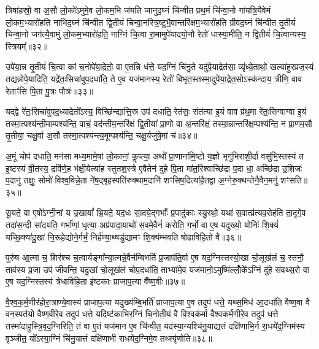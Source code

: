 त्रिषा॑हस्रो॒ वा अ॒सौ लो॒को॑\-ऽमुमे॒व लो॒कम॒भि ज॑यति जानुद॒घ्नं चि॑न्वीत प्रथ॒मं चि॑न्वा॒नो गा॑यत्रि॒यैवेमं लो॒कम॒भ्यारो॑हति नाभिद॒घ्नं चि॑न्वीत द्वि॒तीयं॑ चिन्वा॒नस्त्रि॒ष्टुभै॒वान्तरि॑क्षम॒भ्यारो॑हति ग्रीवद॒घ्नं चि॑न्वीत तृ॒तीयं॑ चिन्वा॒नो जग॑त्यै॒वामुं लो॒कम॒भ्यारो॑हति॒ नाग्निं चि॒त्वा रा॒मामुपे॑यादयो॒नौ रेतो॑ धास्या॒मीति॒ न द्वि॒तीयं॑ चि॒त्वान्यस्य॒ स्त्रियम्᳚॥३२॥

उपे॑या॒न्न तृ॒तीयं॑ चि॒त्वा कां च॒नोपे॑या॒द्रेतो॒ वा ए॒तन्नि ध॑त्ते॒ यद॒ग्निं चि॑नु॒ते यदु॑पे॒याद्रेत॑सा॒ व्यृ॑ध्ये॒ताथो॒ खल्वा॑हुरप्रज॒स्यं तद्यन्नोपे॒यादिति॒ यद्रे॑तः॒सिचा॑वुप॒दधा॑ति॒ ते ए॒व यज॑मानस्य॒ रेतो॑ बिभृत॒स्तस्मा॒दुपे॑या॒द्रेत॒सो\-ऽस्क॑न्दाय॒ त्रीणि॒ वाव रेताꣳ॑सि पि॒ता पु॒त्रः पौत्रः॑॥३३॥

यद्द्वे रे॑तः॒सिचा॑वुपद॒ध्याद्रेतो᳚\-ऽस्य॒ विच्छि॑न्द्यात्ति॒स्र उप॑ दधाति॒ रेत॑सः॒ संत॑त्या इ॒यं वाव प्र॑थ॒मा रे॑तः॒सिग्वाग्वा इ॒यं तस्मा॒त्पश्य॑न्ती॒माम्पश्य॑न्ति॒ वाचं॒ वद॑न्तीम॒न्तरि॑क्षं द्वि॒तीया᳚ प्रा॒णो वा अ॒न्तरि॑क्षं॒ तस्मा॒न्नान्तरि॑क्ष॒म्पश्य॑न्ति॒ न प्रा॒णम॒सौ तृ॒तीया॒ चक्षु॒र्वा अ॒सौ तस्मा॒त्पश्य॑न्त्य॒मूम्पश्य॑न्ति॒ चक्षु॒र्यजु॑षे॒मां च॑॥३४॥

अ॒मूं चोप॑ दधाति॒ मन॑सा मध्य॒मामे॒षां लो॒कानां॒ कॢप्त्या॒ अथो᳚ प्रा॒णाना॑मि॒ष्टो य॒ज्ञो भृगु॑भिराशी॒र्दा वसु॑भि॒स्तस्य॑ त इ॒ष्टस्य॑ वी॒तस्य॒ द्रवि॑णे॒ह भ॑क्षी॒येत्या॑ह स्तुतश॒स्त्रे ए॒वैतेन॑ दुहे पि॒ता मा॑त॒रिश्वाच्छि॑द्रा प॒दा धा॒ अच्छि॑द्रा उ॒शिजः॑ प॒दानु॑ तक्षुः॒ सोमो॑ विश्व॒विन्ने॒ता ने॑ष॒द्बृह॒स्पति॑रुक्थाम॒दानि॑ शꣳसिष॒दित्या॑है॒तद्वा अ॒ग्नेरु॒क्थन्तेनै॒वैन॒मनु॑ शꣳसति॥३५॥

{\anuvakamend[{मि॒नु॒यात्तृ॒तीयं॑ चिन्वा॒नस्त्रियं॒ पौत्र॑श्च॒ वै स॒प्तद॑श च॥८॥}]}

सू॒यते॒ वा ए॒षो᳚\-ऽग्नी॒नां य उ॒खायां᳚ भ्रि॒यते॒ यद॒धः सा॒दये॒द्गर्भाः᳚ प्र॒पादु॑काः स्यु॒रथो॒ यथा॑ स॒वात्प्र॑त्यव॒रोह॑ति ता॒दृगे॒व तदा॑स॒न्दी सा॑दयति॒ गर्भा॑णां॒ धृत्या॒ अप्र॑पादा॒याथो॑ स॒वमे॒वैनं॑ करोति॒ गर्भो॒ वा ए॒ष यदुख्यो॒ योनिः॑ शि॒क्यं॑ यच्छि॒क्या॑दु॒खां नि॒रूहे॒द्योने॒र्गर्भं॒ निर्\mbox{}ह॑ण्या॒थ्षडु॑द्यामꣳ शि॒क्य॑म्भवति षोढाविहि॒तो वै॥३६॥

पुरु॑ष आ॒त्मा च॒ शिर॑श्च च॒त्वार्यङ्गा᳚न्या॒त्मन्ने॒वैन॑म्बिभर्ति प्र॒जाप॑ति॒र्वा ए॒ष यद॒ग्निस्तस्यो॒खा चो॒लूख॑लं च॒ स्तनौ॒ ताव॑स्य प्र॒जा उप॑ जीवन्ति॒ यदु॒खां चो॒लूख॑लं चोप॒दधा॑ति॒ ताभ्या॑मे॒व यज॑मानो॒\-ऽमुष्मि॑ल्लोँ॒के᳚\-ऽग्निं दु॑हे संवथ्स॒रो वा ए॒ष यद॒ग्निस्तस्य॑ त्रेधाविहि॒ता इ॑ष्टकाः प्राजाप॒त्या वै᳚ष्ण॒वीः॥३७॥

वै॒श्व॒क॒र्म॒णीर॑होरा॒त्राण्ये॒वास्य॑ प्राजाप॒त्या यदुख्य॑म्बि॒भर्ति॑ प्राजाप॒त्या ए॒व तदुप॑ धत्ते॒ यथ्स॒मिध॑ आ॒दधा॑ति वैष्ण॒वा वै वन॒स्पत॑यो वैष्ण॒वीरे॒व तदुप॑ धत्ते॒ यदिष्ट॑काभिर॒ग्निं चि॒नोती॒यं वै वि॒श्वक॑र्मा वैश्वकर्म॒णीरे॒व तदुप॑ धत्ते तस्मा॑दाहुस्त्रि॒वृद॒ग्निरिति॒ तं वा ए॒तं यज॑मान ए॒व चि॑न्वीत॒ यद॑स्या॒न्यश्चि॑नु॒याद्यत्तं दक्षि॑णाभि॒र्न रा॒धये॑द॒ग्निम॑स्य वृञ्जीत॒ यो᳚\-ऽस्या॒ग्निं चि॑नु॒यात्तं दक्षि॑णाभी राधयेद॒ग्निमे॒व तथ्स्पृ॑णोति॥३८॥

